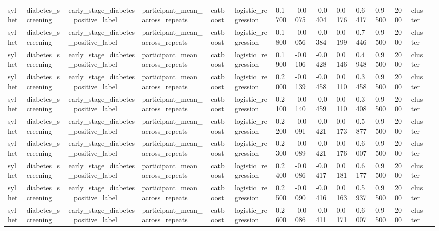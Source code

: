 \begin{tabular}{lllllllllllllll}
sylhet & diabetes\_screening & early\_stage\_diabetes\_positive\_label & participant\_mean\_across\_repeats & catboost & logistic\_regression & 0.1700 & -0.0075 & -0.0404 & 0.0176 & 0.6417 & 0.9500 & 2000 & cluster &  \\
sylhet & diabetes\_screening & early\_stage\_diabetes\_positive\_label & participant\_mean\_across\_repeats & catboost & logistic\_regression & 0.1800 & -0.0056 & -0.0384 & 0.0199 & 0.7446 & 0.9500 & 2000 & cluster &  \\
sylhet & diabetes\_screening & early\_stage\_diabetes\_positive\_label & participant\_mean\_across\_repeats & catboost & logistic\_regression & 0.1900 & -0.0106 & -0.0428 & 0.0146 & 0.4948 & 0.9500 & 2000 & cluster &  \\
sylhet & diabetes\_screening & early\_stage\_diabetes\_positive\_label & participant\_mean\_across\_repeats & catboost & logistic\_regression & 0.2000 & -0.0139 & -0.0458 & 0.0110 & 0.3458 & 0.9500 & 2000 & cluster &  \\
sylhet & diabetes\_screening & early\_stage\_diabetes\_positive\_label & participant\_mean\_across\_repeats & catboost & logistic\_regression & 0.2100 & -0.0140 & -0.0459 & 0.0110 & 0.3408 & 0.9500 & 2000 & cluster &  \\
sylhet & diabetes\_screening & early\_stage\_diabetes\_positive\_label & participant\_mean\_across\_repeats & catboost & logistic\_regression & 0.2200 & -0.0091 & -0.0421 & 0.0173 & 0.5877 & 0.9500 & 2000 & cluster &  \\
sylhet & diabetes\_screening & early\_stage\_diabetes\_positive\_label & participant\_mean\_across\_repeats & catboost & logistic\_regression & 0.2300 & -0.0089 & -0.0421 & 0.0176 & 0.6007 & 0.9500 & 2000 & cluster &  \\
sylhet & diabetes\_screening & early\_stage\_diabetes\_positive\_label & participant\_mean\_across\_repeats & catboost & logistic\_regression & 0.2400 & -0.0086 & -0.0417 & 0.0181 & 0.6177 & 0.9500 & 2000 & cluster &  \\
sylhet & diabetes\_screening & early\_stage\_diabetes\_positive\_label & participant\_mean\_across\_repeats & catboost & logistic\_regression & 0.2500 & -0.0090 & -0.0416 & 0.0163 & 0.5937 & 0.9500 & 2000 & cluster &  \\
sylhet & diabetes\_screening & early\_stage\_diabetes\_positive\_label & participant\_mean\_across\_repeats & catboost & logistic\_regression & 0.2600 & -0.0086 & -0.0411 & 0.0171 & 0.6007 & 0.9500 & 2000 & cluster &  \\

\end{tabular}
